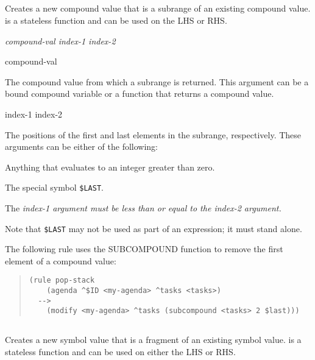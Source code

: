 {{\subsection{}

Creates a new compound value that is a subrange of an existing
compound value.  is a stateless function and can be
used on the LHS or RHS.

\Format

 \it{compound-val} \it{index-1} \it{index-2}

\begin{arguments}
\item[compound-val]

  The compound value from which a subrange is returned. This argument
  can be a bound compound variable or a function that returns a
  compound value.

\item[index-1 index-2]

  The positions of the first and last elements in the subrange,
  respectively. These arguments can be either of the following:
  
  Anything that evaluates to an integer greater than zero.

  The special symbol \verb|$LAST|.

  The \it{index-1} argument must be less than or equal to the
  \it{index-2} argument.

  Note that
  \verb|$LAST| may not be used as part of an expression; it must stand
  alone.
\end{arguments}

\Example

The following rule uses the SUBCOMPOUND function to remove
the first element of a compound value:
\begin{quote}
\begin{verbatim}
(rule pop-stack
    (agenda ^$ID <my-agenda> ^tasks <tasks>)
  -->
    (modify <my-agenda> ^tasks (subcompound <tasks> 2 $last)))
\end{verbatim}
\end{quote}

\subsection{}

Creates a new symbol value that is a fragment of an existing symbol
value.  is a stateless function and can be used on
either the LHS or RHS.

}}
